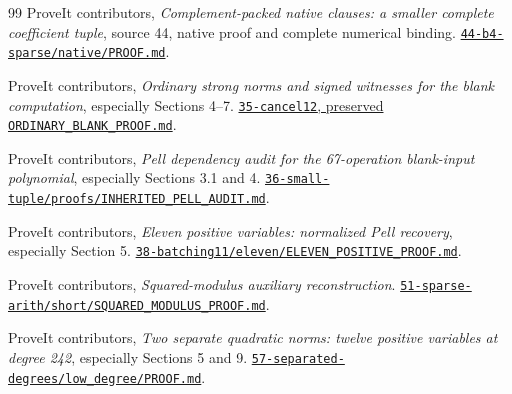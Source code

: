 \documentclass[11pt,a4paper]{article}
\theoremstyle{definition}
\theoremstyle{remark}
\begin{document}
\begin{thebibliography}{99}
\small
{}
ProveIt contributors,
\emph{Complement-packed native clauses: a smaller complete coefficient tuple},
source 44, native proof and complete numerical binding.
\href{https://github.com/VladimirReshetnikov/ProveIt/blob/beb0192cb8dc36f78c369c080f2adfbc1887a486/Computability/DiophantineConsistency/con-zfc-diophantine-forms/44-b4-sparse/native/PROOF.md}
{\texttt{44-b4-sparse/native/PROOF.md}}.

ProveIt contributors,
\emph{Ordinary strong norms and signed witnesses for the blank computation},
especially Sections 4--7.
\href{https://github.com/VladimirReshetnikov/ProveIt/blob/beb0192cb8dc36f78c369c080f2adfbc1887a486/Computability/DiophantineConsistency/con-zfc-diophantine-forms/35-cancel12/sources/catalogue/25-hybrid12/upstream/ORDINARY_BLANK_PROOF.md}
{\texttt{35-cancel12}, preserved \texttt{ORDINARY\_BLANK\_PROOF.md}}.

ProveIt contributors,
\emph{Pell dependency audit for the 67-operation blank-input polynomial},
especially Sections 3.1 and 4.
\href{https://github.com/VladimirReshetnikov/ProveIt/blob/beb0192cb8dc36f78c369c080f2adfbc1887a486/Computability/DiophantineConsistency/con-zfc-diophantine-forms/36-small-tuple/proofs/INHERITED_PELL_AUDIT.md}
{\texttt{36-small-tuple/proofs/INHERITED\_PELL\_AUDIT.md}}.

ProveIt contributors,
\emph{Eleven positive variables: normalized Pell recovery},
especially Section 5.
\href{https://github.com/VladimirReshetnikov/ProveIt/blob/beb0192cb8dc36f78c369c080f2adfbc1887a486/Computability/DiophantineConsistency/con-zfc-diophantine-forms/38-batching11/eleven/ELEVEN_POSITIVE_PROOF.md}
{\texttt{38-batching11/eleven/ELEVEN\_POSITIVE\_PROOF.md}}.

ProveIt contributors,
\emph{Squared-modulus auxiliary reconstruction}.
\href{https://github.com/VladimirReshetnikov/ProveIt/blob/beb0192cb8dc36f78c369c080f2adfbc1887a486/Computability/DiophantineConsistency/con-zfc-diophantine-forms/51-sparse-arith/short/SQUARED_MODULUS_PROOF.md}
{\texttt{51-sparse-arith/short/SQUARED\_MODULUS\_PROOF.md}}.

ProveIt contributors,
\emph{Two separate quadratic norms: twelve positive variables at degree 242},
especially Sections 5 and 9.
\href{https://github.com/VladimirReshetnikov/ProveIt/blob/beb0192cb8dc36f78c369c080f2adfbc1887a486/Computability/DiophantineConsistency/con-zfc-diophantine-forms/57-separated-degrees/low_degree/PROOF.md}
{\texttt{57-separated-degrees/low\_degree/PROOF.md}}.


\end{thebibliography}
\end{document}
